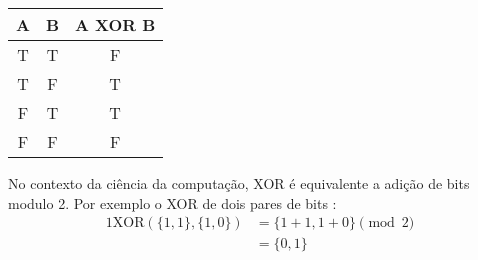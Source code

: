 \begin{enumerate}
\begin{center}
    \begin{tabular}{|c|c|c|}
    \hline
        A & B & A XOR B \\
    \hline\hline
        T & T & F \\
    \hline
        T & F & T \\
    \hline
        F & T & T \\
    \hline
        F & F & F \\
    \hline
    \end{tabular}
\end{center}

No contexto da ciência da computação, XOR é equivalente a adição de bits modulo 2. Por exemplo o XOR de dois pares de bits :
\begin{alignat*}{1}
    \text{XOR}(\{1,1\},\{1,0\}) &= \{1+1,1+0\} \pmod 2 \\
                                &= \{0,1\} 
\end{alignat*}



\end{enumerate}
